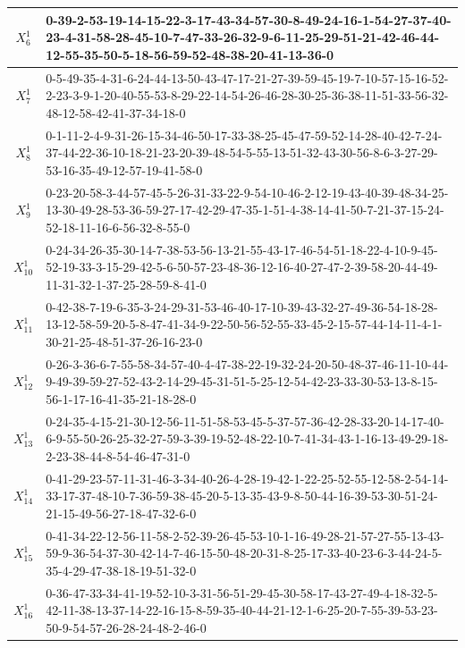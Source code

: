 \begin{landscape}
{\begin{tabularx}{\linewidth}{|c|X|}
        $X_{6}^{1}$  & 0-39-2-53-19-14-15-22-3-17-43-34-57-30-8-49-24-16-1-54-27-37-40-23-4-31-58-28-45-10-7-47-33-26-32-9-6-11-25-29-51-21-42-46-44-12-55-35-50-5-18-56-59-52-48-38-20-41-13-36-0 \\ \hline
        $X_{7}^{1}$  & 0-5-49-35-4-31-6-24-44-13-50-43-47-17-21-27-39-59-45-19-7-10-57-15-16-52-2-23-3-9-1-20-40-55-53-8-29-22-14-54-26-46-28-30-25-36-38-11-51-33-56-32-48-12-58-42-41-37-34-18-0 \\ \hline
        $X_{8}^{1}$  & 0-1-11-2-4-9-31-26-15-34-46-50-17-33-38-25-45-47-59-52-14-28-40-42-7-24-37-44-22-36-10-18-21-23-20-39-48-54-5-55-13-51-32-43-30-56-8-6-3-27-29-53-16-35-49-12-57-19-41-58-0 \\ \hline
        $X_{9}^{1}$  & 0-23-20-58-3-44-57-45-5-26-31-33-22-9-54-10-46-2-12-19-43-40-39-48-34-25-13-30-49-28-53-36-59-27-17-42-29-47-35-1-51-4-38-14-41-50-7-21-37-15-24-52-18-11-16-6-56-32-8-55-0 \\ \hline
        $X_{10}^{1}$ & 0-24-34-26-35-30-14-7-38-53-56-13-21-55-43-17-46-54-51-18-22-4-10-9-45-52-19-33-3-15-29-42-5-6-50-57-23-48-36-12-16-40-27-47-2-39-58-20-44-49-11-31-32-1-37-25-28-59-8-41-0 \\ \hline
        $X_{11}^{1}$ & 0-42-38-7-19-6-35-3-24-29-31-53-46-40-17-10-39-43-32-27-49-36-54-18-28-13-12-58-59-20-5-8-47-41-34-9-22-50-56-52-55-33-45-2-15-57-44-14-11-4-1-30-21-25-48-51-37-26-16-23-0 \\ \hline
        $X_{12}^{1}$ & 0-26-3-36-6-7-55-58-34-57-40-4-47-38-22-19-32-24-20-50-48-37-46-11-10-44-9-49-39-59-27-52-43-2-14-29-45-31-51-5-25-12-54-42-23-33-30-53-13-8-15-56-1-17-16-41-35-21-18-28-0 \\ \hline
        $X_{13}^{1}$ & 0-24-35-4-15-21-30-12-56-11-51-58-53-45-5-37-57-36-42-28-33-20-14-17-40-6-9-55-50-26-25-32-27-59-3-39-19-52-48-22-10-7-41-34-43-1-16-13-49-29-18-2-23-38-44-8-54-46-47-31-0 \\ \hline
        $X_{14}^{1}$ & 0-41-29-23-57-11-31-46-3-34-40-26-4-28-19-42-1-22-25-52-55-12-58-2-54-14-33-17-37-48-10-7-36-59-38-45-20-5-13-35-43-9-8-50-44-16-39-53-30-51-24-21-15-49-56-27-18-47-32-6-0 \\ \hline
        $X_{15}^{1}$ & 0-41-34-22-12-56-11-58-2-52-39-26-45-53-10-1-16-49-28-21-57-27-55-13-43-59-9-36-54-37-30-42-14-7-46-15-50-48-20-31-8-25-17-33-40-23-6-3-44-24-5-35-4-29-47-38-18-19-51-32-0 \\ \hline
        $X_{16}^{1}$ & 0-36-47-33-34-41-19-52-10-3-31-56-51-29-45-30-58-17-43-27-49-4-18-32-5-42-11-38-13-37-14-22-16-15-8-59-35-40-44-21-12-1-6-25-20-7-55-39-53-23-50-9-54-57-26-28-24-48-2-46-0 \\ \hline

\end{tabularx}}
\end{landscape}
